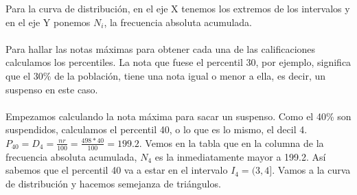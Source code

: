     \begin{center}
    \end{center} 
    Para la curva de distribución, en el eje X tenemos los extremos de los intervalos y en el eje Y ponemos $N_i$, la frecuencia absoluta acumulada. \\ \\
    Para hallar las notas máximas para obtener cada una de las calificaciones calculamos los percentiles. La nota que fuese el percentil 30, por ejemplo, significa que el 30\% de la población, tiene una nota igual o menor a ella, es decir, un suspenso en este caso. \\ \\ 
    Empezamos calculando la nota máxima para sacar un suspenso. Como el 40\% son suspendidos, calculamos el percentil 40, o lo que es lo mismo, el decil 4. $P_{40} = D_{4} = \frac{nr}{100} = \frac{498*40}{100} = 199.2$. Vemos en la tabla que en la columna de la frecuencia absoluta acumulada, $N_4$ es la inmediatamente mayor a 199.2. Así sabemos que el percentil 40 va a estar en el intervalo $I_4 = (3,4]$. Vamos a la curva de distribución y hacemos semejanza de triángulos. \\
    

